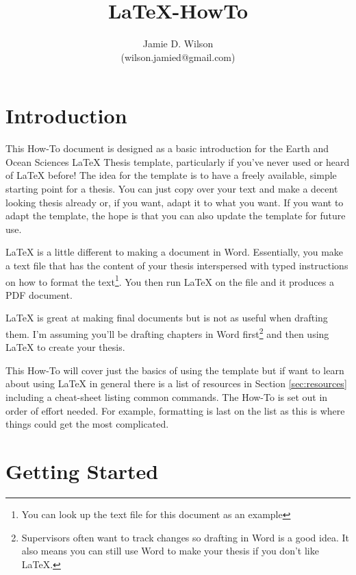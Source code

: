 \documentclass[11pt,a4paper,oneside]{article}
\author{Jamie D. Wilson \\ (wilson.jamied@gmail.com)}
\title{\LaTeX-HowTo}
\begin{document}
\maketitle

\begin{center}
\ccLogo \ccAttribution \ccShareAlike
\end{center}

\tableofcontents

\newpage

\section{Introduction}

This How-To document is designed as a basic introduction for the Earth and Ocean Sciences \LaTeX{} Thesis template, particularly if you've never used or heard of \LaTeX{} before! The idea for the template is to have a freely available, simple starting point for a thesis. You can just copy over your text and make a decent looking thesis already or, if you want, adapt it to what you want.  If you want to adapt the template, the hope is that you can also update the template for future use. 

\LaTeX{} is a little different to making a document in Word.  Essentially, you make a text file that has the content of your thesis interspersed with typed instructions on how to format the text\footnote{You can look up the text file for this document as an example}.  You then run \LaTeX{} on the file and it produces a PDF document. 

\LaTeX{} is great at making final documents but is not as useful when drafting them. I'm assuming you'll be drafting chapters in Word first\footnote{Supervisors often want to track changes so drafting in Word is a good idea.  It also means you can still use Word to make your thesis if you don't like \LaTeX.} and then using \LaTeX{} to create your thesis.

This How-To will cover just the basics of using the template but if want to learn about using \LaTeX{} in general there is a list of resources in Section \ref{sec:resources} including a cheat-sheet listing common commands.  The How-To is set out in order of effort needed.  For example, formatting is last on the list as this is where things could get the most complicated.

\section{Getting Started}
\end{document}
